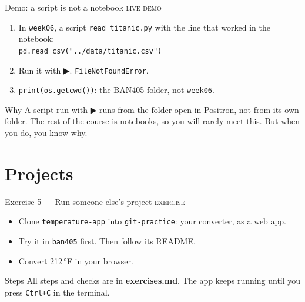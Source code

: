 \documentclass[aspectratio=169,11pt]{beamer}
\newcommand{\code}[1]{\texttt{#1}}
\newcommand{\key}[1]{\textbf{\textcolor{ban}{#1}}}
\newcommand{\exerciseframe}[3]{%
  \begin{frame}[t]{#1}
    \vspace{0.4em}
    {\small\textcolor{softgray}{\textsc{exercise}}}\par\vspace{0.6em}
    #2
    \vfill
    \begin{block}{Steps}
      All steps and checks are in \key{exercises.md}. #3
    \end{block}
    \vspace{0.6em}
  \end{frame}}
\begin{document}
\begin{frame}[t]{Demo: a script is not a notebook}
  \vspace{0.3em}
  {\small\textcolor{softgray}{\textsc{live demo}}}\par\vspace{0.4em}
  \begin{enumerate}
    \item In \code{week06}, a script \code{read\_titanic.py} with the line that worked in the notebook:\\
      \code{pd.read\_csv("../data/titanic.csv")}
    \item Run it with ▶. \code{FileNotFoundError}.
    \item \code{print(os.getcwd())}: the BAN405 folder, not \code{week06}.
  \end{enumerate}
  \vfill
  \begin{block}{Why}
    A script run with ▶ runs from the folder open in Positron, not from its own folder. The rest of the course is notebooks, so you will rarely meet this. But when you do, you know why.
  \end{block}
\end{frame}

\section{Projects}

\exerciseframe{Exercise 5 --- Run someone else's project}{%
  \begin{itemize}
    \item Clone \code{temperature-app} into \code{git-practice}: your converter, as a web app.
    \item Try it in \code{ban405} first. Then follow its README.
    \item Convert 212\,°F in your browser.
  \end{itemize}}{The app keeps running until you press \code{Ctrl+C} in the terminal.}
\end{document}
